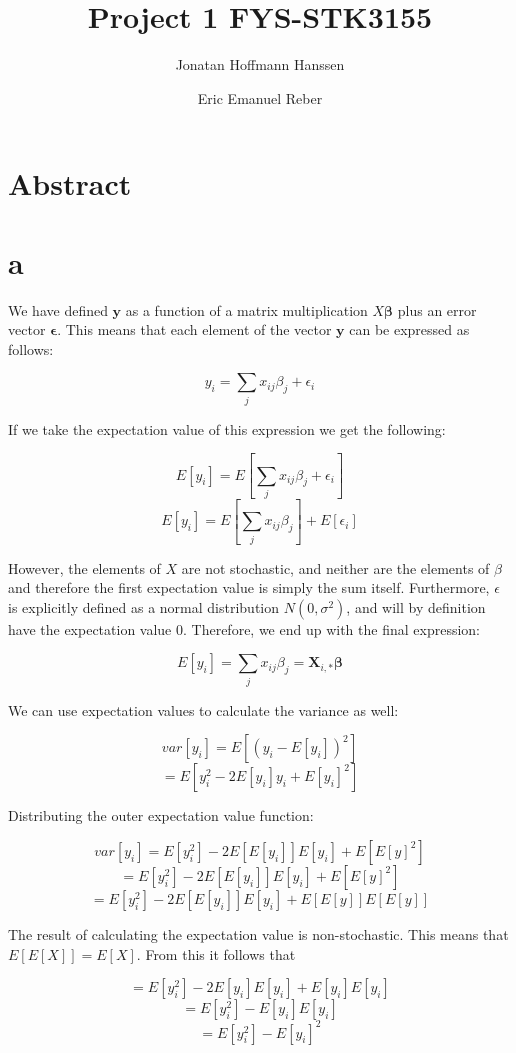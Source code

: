 \documentclass{article}
\author{Jonatan Hoffmann Hanssen \and Eric Emanuel Reber}
\title{Project 1 FYS-STK3155}
\begin{document}
	\maketitle

\section*{Abstract}

\section*{a}

We have defined $\bm{y}$ as a function of a matrix multiplication $X\bm{\beta}$
plus an error vector $\bm{\epsilon}$. This means that each element of the vector
$\bm{y}$ can be expressed as follows:

\[ y_i = \sum_j x_{ij}\beta_j + \epsilon_i \]

If we take the expectation value of this expression we get the following:

\[ E[y_i] = E\left[\sum_j x_{ij}\beta_j + \epsilon_i\right] \]
\[ E[y_i] = E\left[\sum_j x_{ij}\beta_j\right] + E[\epsilon_i] \]

However, the elements of $X$ are not stochastic, and neither are the elements of $\beta$
and therefore
the first expectation value is simply the sum itself. Furthermore, $\epsilon$ is 
explicitly defined as a normal distribution $N(0,\sigma^2)$, and will by definition have
the expectation value $0$. Therefore, we end up with the final expression:

\[ E[y_i] = \sum_j x_{ij}\beta_j = \bm{X}_{i,*}\bm{\beta}\]

We can use expectation values to calculate the variance as well:

\[ var[y_i] = E\left[(y_i - E[y_i])^2\right] \]
\[ = E\left[y_i^2 - 2E[y_i]y_i + E[y_i]^2\right] \]

Distributing the outer expectation value function:

\[ var[y_i] = E[y_i^2] - 2E\left[E[y_i]\right]E[y_i] + E\left[E[y]^2\right] \]
\[ = E[y_i^2] - 2E\left[E[y_i]\right]E[y_i] + E\left[E[y]^2\right] \]
\[ = E[y_i^2] - 2E\left[E[y_i]\right]E[y_i] + E\left[E[y]\right]E\left[E[y]\right] \]

The result of calculating the expectation value is non-stochastic. This means that
$E[E[X]] = E[X]$. From this it follows that

\[ = E[y_i^2] - 2E[y_i]E[y_i] + E[y_i]E[y_i] \]
\[ = E[y_i^2] - E[y_i]E[y_i] \]
\[ = E[y_i^2] - E[y_i]^2 \]
\end{document}
